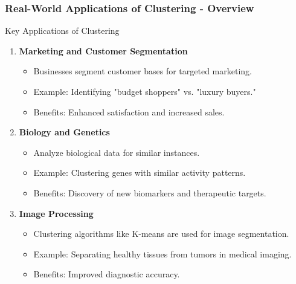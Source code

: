 \documentclass[aspectratio=169]{beamer}
\begin{document}
\begin{frame}[fragile]
    \frametitle{Real-World Applications of Clustering - Overview}
    \begin{block}{Key Applications of Clustering}
        \begin{enumerate}
            \item \textbf{Marketing and Customer Segmentation}
                \begin{itemize}
                    \item Businesses segment customer bases for targeted marketing.
                    \item Example: Identifying "budget shoppers" vs. "luxury buyers."
                    \item Benefits: Enhanced satisfaction and increased sales.
                \end{itemize}

            \item \textbf{Biology and Genetics}
                \begin{itemize}
                    \item Analyze biological data for similar instances.
                    \item Example: Clustering genes with similar activity patterns.
                    \item Benefits: Discovery of new biomarkers and therapeutic targets.
                \end{itemize}

            \item \textbf{Image Processing}
                \begin{itemize}
                    \item Clustering algorithms like K-means are used for image segmentation.
                    \item Example: Separating healthy tissues from tumors in medical imaging.
                    \item Benefits: Improved diagnostic accuracy.
                \end{itemize}
        \end{enumerate}
    \end{block}
\end{frame}
\end{document}
